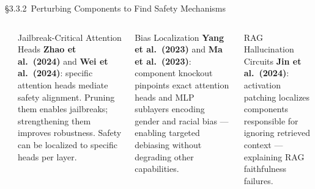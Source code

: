 \begin{frame}{\S3.3.2\ Perturbing Components to Find Safety Mechanisms}
\begin{columns}[T]
    {\small\bfseries{}}
    \begin{ucrcard}[UCRnavy]{Jailbreak-Critical Attention Heads}
      \scriptsize
      \textbf{Zhao et al.\ (2024)} and \textbf{Wei et al.\ (2024)}: specific attention heads mediate safety alignment. Pruning them enables jailbreaks; strengthening them improves robustness. Safety can be localized to specific heads per layer.
    \end{ucrcard}
    \vspace{0.3em}
    \begin{ucrcard}[UCRnavy]{Bias Localization}
      \scriptsize
      \textbf{Yang et al.\ (2023)} and \textbf{Ma et al.\ (2023)}: component knockout pinpoints exact attention heads and MLP sublayers encoding gender and racial bias --- enabling targeted debiasing without degrading other capabilities.
    \end{ucrcard}
    \vspace{0.3em}
    \begin{ucrcard}[UCRnavy]{RAG Hallucination Circuits}
      \scriptsize
      \textbf{Jin et al.\ (2024)}: activation patching localizes components responsible for ignoring retrieved context --- explaining RAG faithfulness failures.
    \end{ucrcard}
  \end{columns}
\end{frame}


